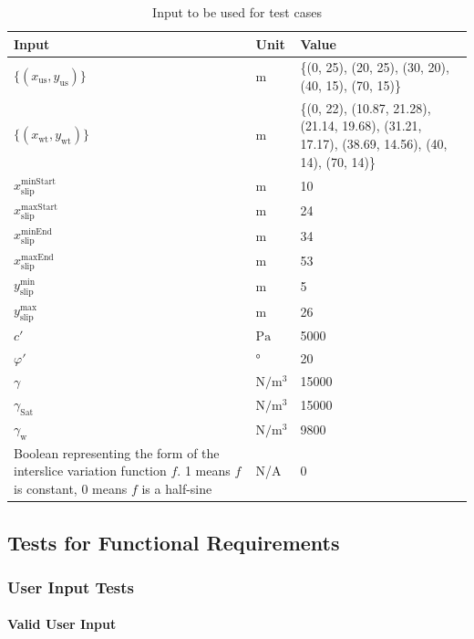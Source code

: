 \documentclass[12pt, titlepage]{article}
\begin{document}
\begin{table}[!h]
	\renewcommand{\arraystretch}{1.5}
	\begin{tabularx}{1.0\textwidth}{p{7cm} l X}
		\toprule \textbf{Input} &
		\textbf{Unit} & \textbf{Value}\\ \midrule
		$\{\left(x_\text{us},y_\text{us}\right)\}$ & $\text{m}$ & \{(0, 25), 
		(20, 25), (30, 20), (40, 15), (70, 15)\}\\
		$\{\left(x_\text{wt},y_\text{wt}\right)\}$ & $\text{m}$ & \{(0, 22), 
		(10.87, 21.28), (21.14, 19.68), (31.21, 17.17), (38.69, 14.56), (40, 
		14), (70, 14)\}\\
		${x_\text{slip}^\text{minStart}}$ & $\text{m}$ & 10\\
		${x_\text{slip}^\text{maxStart}}$ & $\text{m}$ & 24\\
		${x_\text{slip}^\text{minEnd}}$ & $\text{m}$ & 34\\
		${x_\text{slip}^\text{maxEnd}}$ & $\text{m}$ & 53\\
		${y_\text{slip}^\text{min}}$ & $\text{m}$ & 5\\
		${y_\text{slip}^\text{max}}$ & $\text{m}$ & 26\\
		$c'$ & $\si{\pascal}$ & 5000 \\
		$\varphi'$ & \si{\degree} & 20\\
		$\gamma$ & $\si{\newton\per\meter\cubed}$ & 15000 \\
		$\gamma_{\text{Sat}}$ & $\si{\newton\per\meter\cubed}$ & 15000 \\
		$\gamma_{\text{w}}$ & $\si{\newton\per\meter\cubed}$ & 9800 \\
		Boolean representing the form of the interslice variation function $f$. 
		1 means $f$ is constant, 0 means $f$ is a half-sine & N/A & 0\\ 
		\bottomrule
	\end{tabularx}
	\caption{Input to be used for test cases}
	\label{ExValidInputs}
\end{table}
	
\subsection{Tests for Functional Requirements}

\subsubsection{User Input Tests}
		
\paragraph{Valid User Input}
\end{document}
